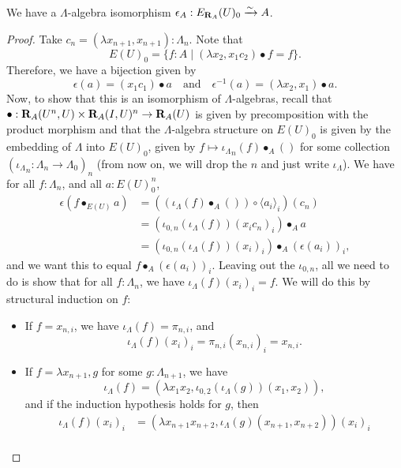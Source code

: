 \begin{lemma}\label{lem:elementary-essentially-surjective}
  We have a $ \Lambda $-algebra isomorphism $ \epsilon_A : E_{\mathbf{R}_A}(U)_0 \xrightarrow \sim A $.
\end{lemma}
\begin{proof}
  Take $ c_n = (\lambda x_{n + 1}, x_{n + 1}): \Lambda_n $. Note that
  \[ E(U)_0 = \{ f : A \mid (\lambda x_2, x_1 c_2) \bullet f = f \}. \]
  Therefore, we have a bijection given by
  \[ \epsilon(a) = (x_1 c_1) \bullet a \quad \text{and} \quad \epsilon^{-1}(a) = (\lambda x_2, x_1) \bullet a. \]
  Now, to show that this is an isomorphism of $ \Lambda $-algebras, recall that $ \bullet: \mathbf{R}_A(U^n, U) \times \mathbf{R}_A(I, U)^n \to \mathbf{R}_A(U) $ is given by precomposition with the product morphism and that the $ \Lambda $-algebra structure on $ E(U)_0 $ is given by the embedding of $ \Lambda $ into $ E(U)_0 $, given by $ f \mapsto {\iota_\Lambda}_n(f) \bullet_A () $ for some collection $ ({\iota_\Lambda}_n: \Lambda_n \to \Lambda_0)_n $ (from now on, we will drop the $ n $ and just write $ \iota_\Lambda $). We have for all $ f: \Lambda_n $, and all $ a : E(U)_0^n $,
  \begin{align*}
    \epsilon(f \bullet_{E(U)} a)
    &= ((\iota_\Lambda(f) \bullet_A ()) \circ \langle a_i \rangle_i)(c_n)\\
    &= (\iota_{0, n}(\iota_\Lambda(f)) (x_i c_n)_i) \bullet_A a\\
    &= (\iota_{0, n}(\iota_\Lambda(f)) (x_i)_i) \bullet_A (\epsilon(a_i))_i,
  \end{align*}
  and we want this to equal $ f \bullet_A (\epsilon(a_i))_i $. Leaving out the $ \iota_{0, n} $, all we need to do is show that for all $ f: \Lambda_n $, we have $ \iota_\Lambda(f) (x_i)_i = f $. We will do this by structural induction on $ f $:
  \begin{itemize}
    \item If $ f = x_{n, i} $, we have $ \iota_\Lambda(f) = \pi_{n, i} $, and
      \[ \iota_\Lambda(f) (x_i)_i = \pi_{n, i} (x_{n, i})_i = x_{n, i}. \]
    \item If $ f = \lambda x_{n + 1}, g $ for some $ g: \Lambda_{n + 1} $, we have
      \[ \iota_\Lambda(f) = (\lambda x_1 x_2, \iota_{0, 2}(\iota_\Lambda(g)) (x_1, x_2)), \]
      and if the induction hypothesis holds for $ g $, then
      \begin{align*}
        \iota_\Lambda(f) (x_i)_i
        &= (\lambda x_{n + 1} x_{n + 2}, \iota_\Lambda(g) (x_{n + 1}, x_{n + 2})) (x_i)_i\\

\end{align*}
\end{itemize}
\end{proof}
